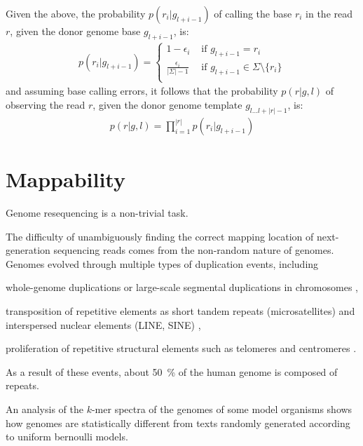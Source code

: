 Given the above, the probability $p(r_i | g_{l+i-1})$ of calling the base $r_i$ in the read $r$, given the donor genome base $g_{l+i-1}$, is:
\begin{eqnarray}
p(r_i | g_{l+i-1}) = \left\{
\begin{array}{ll}
1-\epsilon_i                  & \text{ if } g_{l+i-1} = r_i\\
\frac{\epsilon_i}{|\Sigma|-1} & \text{ if } g_{l+i-1} \in \Sigma \setminus \{r_i\}\\
\end{array}
\right.
\end{eqnarray}
and assuming \iid base calling errors, it follows that the probability $p(r | g, l)$ of observing the read $r$, given the donor genome template $g_{l \dots l+|r|-1}$, is:
\begin{eqnarray}
\label{eq:phred}
p(r | g, l) = \prod_{i=1}^{|r|}{p(r_i | g_{l+i-1})}
\end{eqnarray}


\section{Mappability}
\label{sec:mappability}

Genome resequencing is a non-trivial task.

The difficulty of unambiguously finding the correct mapping location of next-generation sequencing reads comes from the non-random nature of genomes.
Genomes evolved through multiple types of duplication events, including
\begin{inparaenum}[(i)]
\item whole-genome duplications \citep{?} or large-scale segmental duplications in chromosomes \citep{?},
\item transposition of repetitive elements as short tandem repeats (microsatellites) and interspersed nuclear elements (LINE, SINE) \citep{?},
\item proliferation of repetitive structural elements such as telomeres and centromeres \citep{?}.
\end{inparaenum}
As a result of these events, about 50~\% of the human genome is composed of repeats.

An analysis of the $k$-mer spectra of the genomes of some model organisms shows how genomes are statistically different from texts randomly generated according to uniform bernoulli models.


